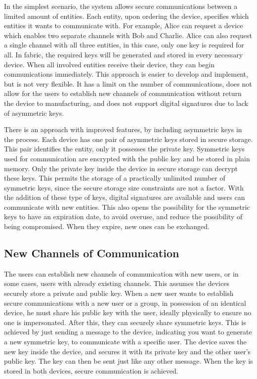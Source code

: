 In the simplest scenario, the system allows secure communications between a limited amount of entities. Each entity, upon ordering the device, specifies which entities it wants to communicate with. For example, Alice can request a device which enables two separate channels with Bob and Charlie. Alice can also request a single channel with all three entities, in this case, only one key is required for all.
In fabric, the required keys will be generated and stored in every necessary device. When all involved entities receive their device, they can begin communications immediately.
This approach is easier to develop and implement, but is not very flexible. It has a limit on the number of communications, does not allow for the users to establish new channels of communication without return the device to manufacturing, and does not support digital signatures due to lack of asymmetric keys.

There is an approach with improved features, by including asymmetric keys in the process.
Each device has one pair of asymmetric keys stored in secure storage. This pair identifies the entity, only it possesses the private key. Symmetric keys used for communication are encrypted with the public key and be stored in plain memory. Only the private key inside the device in secure storage can decrypt these keys. This permits the storage of a practically unlimited number of symmetric keys, since the secure storage size constraints are not a factor.
With the addition of these type of keys, digital signatures are available and users can communicate with new entities. This also opens the possibility for the symmetric keys to have an expiration date, to avoid overuse, and reduce the possibility of being compromised. When they expire, new ones can be exchanged.

\subsection{New Channels of Communication}\label{chap:problem:scenarios:keys}

The users can establish new channels of communication with new users, or in some cases, users with already existing channels. This assumes the devices securely store a private and public key.
When a new user wants to establish secure communications with a new user or a group, in possession of an identical device, he must share his public key with the user, ideally physically to ensure no one is impersonated. After this, they can securely share symmetric keys. This is achieved by just sending a message to the device, indicating you want to generate a new symmetric key, to communicate with a specific user. The device saves the new key inside the device, and secures it with its private key and the other user's public key. The key can then be sent just like any other message. When the key is stored in both devices, secure communication is achieved.

